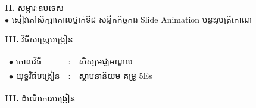\documentclass[a4paper,10pt]{article}
\begin{document}
{\vspace{3pt}

\textbf{II.} {\muol សម្ភារៈឧបទេស}\\[2pt]
\hspace*{0.55cm}$\bullet$ \hspace{0.35cm} សៀវភៅសិក្សាគោលថ្នាក់ទី៨ សន្លឹកកិច្ចការ Slide Animation បន្ទះរូបត្រីកោណ

\vspace{3pt}

\textbf{III.} {\muol វិធីសាស្រ្តបង្រៀន}\\[2pt]
\hspace*{0.55cm}%
\begin{tabular}{@{}l l l@{}}
  $\bullet$ \hspace{0.35cm} គោលវិធី & : \hspace{0.7cm} & សិស្សមជ្ឈមណ្ឌល \\
  $\bullet$ \hspace{0.35cm} យុទ្ធវិធីបង្រៀន & : & ស្ថាបនានិយម គម្រូ 5Es \\
\end{tabular}
}

\vspace{3pt}

\textbf{III.} {\muol ដំណើរការបង្រៀន}

\vspace{-3pt}
\end{document}

